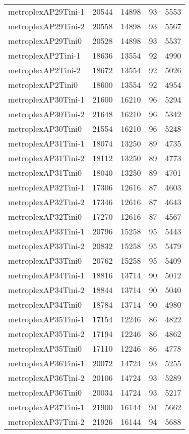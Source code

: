 \begin{longtable}{lrrrr}
metroplexAP29Tini-1 & 20544 & 14898 & 93 & 5553 \\
metroplexAP29Tini-2 & 20558 & 14898 & 93 & 5567 \\
metroplexAP29Tini0 & 20528 & 14898 & 93 & 5537 \\
metroplexAP2Tini-1 & 18636 & 13554 & 92 & 4990 \\
metroplexAP2Tini-2 & 18672 & 13554 & 92 & 5026 \\
metroplexAP2Tini0 & 18600 & 13554 & 92 & 4954 \\
metroplexAP30Tini-1 & 21600 & 16210 & 96 & 5294 \\
metroplexAP30Tini-2 & 21648 & 16210 & 96 & 5342 \\
metroplexAP30Tini0 & 21554 & 16210 & 96 & 5248 \\
metroplexAP31Tini-1 & 18074 & 13250 & 89 & 4735 \\
metroplexAP31Tini-2 & 18112 & 13250 & 89 & 4773 \\
metroplexAP31Tini0 & 18040 & 13250 & 89 & 4701 \\
metroplexAP32Tini-1 & 17306 & 12616 & 87 & 4603 \\
metroplexAP32Tini-2 & 17346 & 12616 & 87 & 4643 \\
metroplexAP32Tini0 & 17270 & 12616 & 87 & 4567 \\
metroplexAP33Tini-1 & 20796 & 15258 & 95 & 5443 \\
metroplexAP33Tini-2 & 20832 & 15258 & 95 & 5479 \\
metroplexAP33Tini0 & 20762 & 15258 & 95 & 5409 \\
metroplexAP34Tini-1 & 18816 & 13714 & 90 & 5012 \\
metroplexAP34Tini-2 & 18844 & 13714 & 90 & 5040 \\
metroplexAP34Tini0 & 18784 & 13714 & 90 & 4980 \\
metroplexAP35Tini-1 & 17154 & 12246 & 86 & 4822 \\
metroplexAP35Tini-2 & 17194 & 12246 & 86 & 4862 \\
metroplexAP35Tini0 & 17110 & 12246 & 86 & 4778 \\
metroplexAP36Tini-1 & 20072 & 14724 & 93 & 5255 \\
metroplexAP36Tini-2 & 20106 & 14724 & 93 & 5289 \\
metroplexAP36Tini0 & 20034 & 14724 & 93 & 5217 \\
metroplexAP37Tini-1 & 21900 & 16144 & 94 & 5662 \\
metroplexAP37Tini-2 & 21926 & 16144 & 94 & 5688 \\

\end{longtable}

